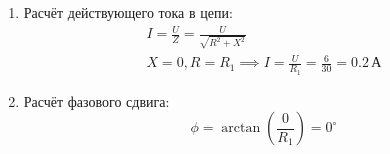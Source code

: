 \begin{enumerate}
	\item Расчёт действующего тока в цепи:
	      \[
		      \begin{gathered}
			      I = \frac{U}{Z} = \frac{U}{\sqrt{R^2 + X^2}} \\
			      X = 0, R = R_1 \implies I = \frac{U}{R_1} = \frac{6}{30} = 0.2 \, \text{А}
		      \end{gathered}
	      \]
	\item Расчёт фазового сдвига:
	      \[
		      \phi = \arctan\left(\frac{0}{R_1}\right) = 0^{\circ}
	      \]
\end{enumerate}

